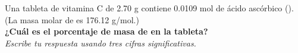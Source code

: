 Una tableta de vitamina C de 2.70 g contiene 0.0109 mol de ácido ascórbico (). (La masa molar de  es 176.12 g/mol.)\\
\textbf{¿Cuál es el porcentaje de masa de  en la tableta?}\\
\emph{Escribe tu respuesta usando tres cifras significativas.}\\